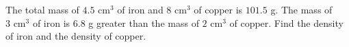 The total mass of $4.5\text{ cm}^3$ of iron and $8\text{ cm}^3$ of copper is $101.5$ g. The mass of $3\text{ cm}^3$ of iron is $6.8$ g greater than the mass of $2\text{ cm}^3$ of copper. Find the density of iron and the density of copper.

